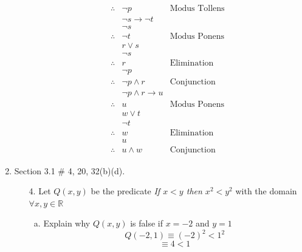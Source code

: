 \documentclass[12pt]{article}
\newcommand{\R}{\mathbb{R}}
\newcommand{\paren}[1]{\left( #1 \right)}
\begin{document}
\begin{enumerate}
\begin{enumerate}
\begin{align*}
                        \therefore  & \neg p                          & \text{Modus Tollens}\\
                                    & \neg s \rightarrow \neg t\\
                                    & \neg s\\
                        \therefore  & \neg t                          & \text{Modus Ponens}\\
                                    & r \vee s\\
                                    & \neg s\\
                        \therefore  & r                               & \text{Elimination}\\
                                    & \neg p\\
                        \therefore  & \neg p \wedge r                 & \text{Conjunction}\\
                                    & \neg p \wedge r \rightarrow u\\
                        \therefore  & u                               & \text{Modus Ponens}\\
                                    & w \vee t\\
                                    & \neg t\\
                        \therefore  & w                               & \text{Elimination}\\
                                    & u\\
                        \therefore  & u \wedge w                      & \text{Conjunction}
                    \end{align*}
            \end{enumerate}
        \newpage
        \item Section 3.1 \# 4, 20, 32(b)(d).
            \begin{enumerate}
                \item[4.] Let $Q(x,y)$ be the predicate \textit{If $x<y$ then $x^2 < y^2$} with the domain $\forall x,y \in \R$
                    \begin{enumerate}[a.]
                        \item Explain why $Q(x,y)$ is false if $x=-2$ and $y=1$
                            \[
                            Q(-2,1) \equiv \paren{-2}^2 < 1^2
                            \]
                            \[
                            \equiv 4 < 1
                            \]

\end{enumerate}
\end{enumerate}
\end{enumerate}
\end{document}
